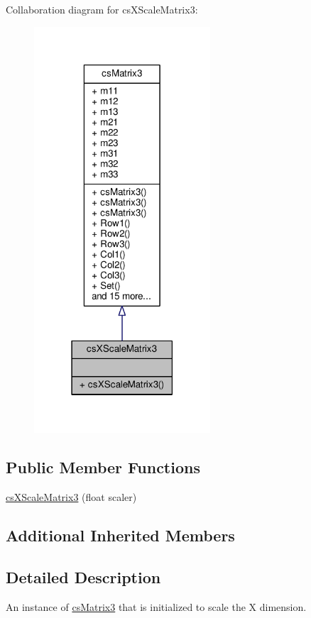 Collaboration diagram for cs\+X\+Scale\+Matrix3\+:
\nopagebreak
\begin{figure}[H]
\begin{center}
\leavevmode
\includegraphics[width=186pt]{d7/dc0/classcsXScaleMatrix3__coll__graph}
\end{center}
\end{figure}
\subsection*{Public Member Functions}
\begin{DoxyCompactItemize}
\item 
\hyperlink{classcsXScaleMatrix3_ab0dd071cac694f5760ece07974ad283a}{cs\+X\+Scale\+Matrix3} (float scaler)
\end{DoxyCompactItemize}
\subsection*{Additional Inherited Members}


\subsection{Detailed Description}
An instance of \hyperlink{classcsMatrix3}{cs\+Matrix3} that is initialized to scale the X dimension. 


